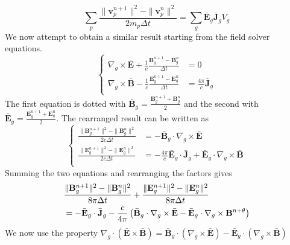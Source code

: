 \begin{equation}
\label{eq: subs kinetic}
     \sum_p \frac{\|\textbf{v}_p^{n+1}\|^2 - \|\textbf{v}_p^{n}\|^2}{2 m_p \Delta t}= \sum_g \bar{\textbf{E}}_g \bar{\textbf{J}}_g V_g
\end{equation}
We now attempt to obtain a similar result starting from the field solver equations.
\begin{equation}
\left\{\begin{aligned} 
 	\nabla_g \times \bar{\mathbf{E}} +\frac{1}{c}\frac{\mathbf{B}_g^{n+1} - \mathbf{B}_g^{n}}{\Delta t} &= 0 \\
 	\nabla_g \times \bar{\mathbf{B}} -\frac{1}{c}\frac{\mathbf{E}_g^{n+1} - \mathbf{E}_g^{n}}{\Delta t} &= \frac{4 \pi}{c}\bar{\mathbf{J}}_g\\
 \end{aligned}\right.
\end{equation}
The first equation is dotted with $\bar{\textbf{B}}_g = \frac{\textbf{B}^{n+1}_g + \textbf{B}^{n}_g}{2}$ and the second with $\bar{\textbf{E}}_g = \frac{\textbf{E}^{n+1}_g + \textbf{E}^{n}_g}{2}$. The rearranged result can be written as
\begin{equation}
\left\{\begin{aligned} 
 	\frac{\|\mathbf{B}_g^{n+1}\|^2 - \|\mathbf{B}_g^{n}\|^2}{2 c \Delta t} &= -\bar{\textbf{B}}_g \cdot \nabla_g \times \bar{\mathbf{E}} \\
 	\frac{\|\mathbf{E}_g^{n+1}\|^2 - \|\mathbf{E}_g^{n}\|^2}{2 c \Delta t} &= -\frac{4 \pi}{c}\bar{\textbf{E}}_g \cdot \bar{\mathbf{J}}_g + \bar{\textbf{E}}_g \cdot \nabla_g \times \bar{\mathbf{B}}  \\
 \end{aligned}\right.
\end{equation}
Summing the two equations and rearranging the factors gives
\begin{align}
    &\frac{\|\mathbf{B}_g^{n+1}\|^2 - \|\mathbf{B}_g^{n}\|^2}{8 \pi \Delta t} + \frac{\|\mathbf{E}_g^{n+1}\|^2 - \|\mathbf{E}_g^{n}\|^2}{8 \pi \Delta t} \notag \\
     &= -\bar{\textbf{E}}_g \cdot \bar{\mathbf{J}}_g - \frac{c}{4\pi} \left( \bar{\textbf{B}}_g \cdot \nabla_g \times \bar{\mathbf{E}}- \bar{\textbf{E}}_g \cdot \nabla_g \times \mathbf{B}^{n+ \theta} \right)
\end{align}
We now use the property $\nabla_g \cdot (\bar{\textbf{E}} \times \bar{\mathbf{B}}) = \bar{\textbf{B}}_g \cdot (\nabla_g \times \bar{\mathbf{E}})- \bar{\textbf{E}}_g \cdot (\nabla_g \times \bar{\mathbf{B}})$
